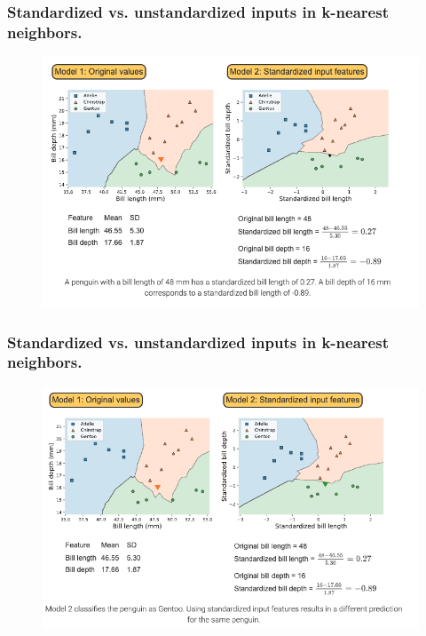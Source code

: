 \documentclass[8pt,dvipsnames]{beamer}
\begin{document}
\begin{frame}
	\frametitle{Standardized vs. unstandardized inputs in k-nearest neighbors.}
	\begin{figure}[ht]
		\centering
		\includegraphics[width=\linewidth]{imgs/knn_42.png}
	\end{figure}
\end{frame}

\begin{frame}
	\frametitle{Standardized vs. unstandardized inputs in k-nearest neighbors.}
	\begin{figure}[ht]
		\centering
		\includegraphics[width=\linewidth]{imgs/knn_43.png}
	\end{figure}
\end{frame}
\end{document}
